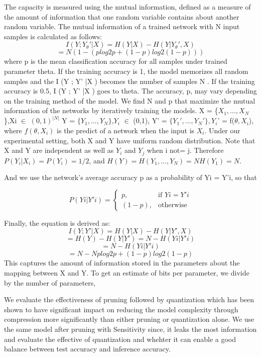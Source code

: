 \cite{45932}\cite{cap}
The capacity is measured using the mutual information, defined as a measure of the amount of information that one random variable contains about another random variable. The mutual information of a trained network with N input samples is calculated as follows:
\begin{equation}
I ( Y ; Y_{\theta}' | X ) = H ( Y | X ) - H ( Y | Y_{\theta}' , X )
\end{equation}
\begin{equation}
=N (1-(plog2 p+(1-p)log2 (1-p)) )
\end{equation}
where p is the mean classification accuracy for all samples under trained parameter theta. If the training accuracy is 1, the model memorizes all random samples and the I (Y ; Y' |X ) becomes the number
of samples N . If the training accuracy is 0.5, I (Y ; Y' |X ) goes to theta.
The accuracy, p, may vary depending on the training method of the model. We find N and p that maximize the mutual information of the networks by iteratively training the models.
X = \{$X_1,...,X_N$\},Xi $\in$ $(0,1)^{|N|}$
Y = $\{Y_1,...,Y_N\}$,$Y_i$ $\in$ (0,1),
Y' = $\{Y_1', ..., Y_N'\}, Y_i$' = f($\theta, X_i$),
where $f(\theta,X_i)$ is the predict of a network when the input is $X_i$. Under our experimental setting, both X and Y have uniform random distribution. Note that X and Y are independent as well as $Y_i$ and $Y_j$ when i not= j. Therefore
$P (Y_i|X_i) = P (Y_i) = 1/2$, and $H(Y) = H(Y_1, ..., Y_N ) = N H(Y_1) = N$.

And we use the network’s average accuracy p as a probability of Yi = Y'i, so that

\[
    P(Yi|Y'i)=
\begin{cases}
    p, & \text{if } Yi =Y'i\\
    (1 - p),  & \text{otherwise}
\end{cases}
\]

Finally, the equation is derived as:
\begin{equation}
I(Y;Y'|X)= H ( Y | X ) - H ( Y | Y' , X )
\end{equation}
\begin{equation}
= H ( Y ) - H ( Y | Y' ) = N -   H ( Y i | Y' i )
\end{equation}
\begin{equation}
= N -   H ( Y i | Y' i )
\end{equation}
\begin{equation}
=N-N plog2 p+(1-p)log2 (1-p)
\end{equation}
This captures
the amount of information stored in the parameters about the mapping between X and Y. To get an estimate of bits per parameter, we divide by the number of parameters,



We evaluate the effectiveness of pruning followed by quantization which has been shown to have significant impact on reducing the model complexity through compression more significantly than either pruning or quantization alone.
We use the same model after pruning with Sensitivity since, it leaks the most information and evaluate the effective of quantization and whehter it can enable a good balance between test accuracy and inference accuracy.
